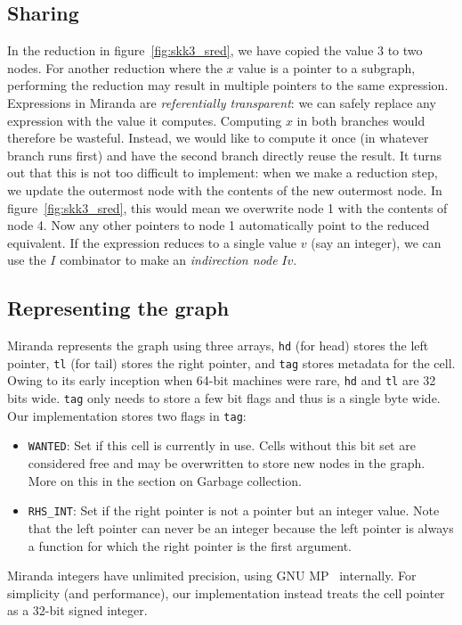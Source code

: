 \documentclass[conference]{IEEEtran}
\begin{document}
\subsection{Sharing}
In the reduction in figure~\ref{fig:skk3_sred}, we have copied the value $3$ to two nodes.
For another reduction where the $x$ value is a pointer to a subgraph, performing the reduction may result in multiple pointers to the same expression.
Expressions in Miranda are \textit{referentially transparent}: we can safely replace any expression with the value it computes.
Computing $x$ in both branches would therefore be wasteful.
Instead, we would like to compute it once (in whatever branch runs first) and have the second branch directly reuse the result.
It turns out that this is not too difficult to implement: when we make a reduction step, we update the outermost node with the contents of the new outermost node.
In figure~\ref{fig:skk3_sred}, this would mean we overwrite node 1 with the contents of node 4.
Now any other pointers to node 1 automatically point to the reduced equivalent.
If the expression reduces to a single value $v$ (say an integer), we can use the $I$ combinator to make an \textit{indirection node} $I v$.

\subsection{Representing the graph}
Miranda represents the graph using three arrays, \texttt{hd} (for head) stores the left pointer, \texttt{tl} (for tail) stores the right pointer, and \texttt{tag} stores metadata for the cell.
Owing to its early inception when 64-bit machines were rare, \texttt{hd} and \texttt{tl} are 32 bits wide.
\texttt{tag} only needs to store a few bit flags and thus is a single byte wide.
Our implementation stores two flags in \texttt{tag}:
\begin{itemize}
    \item \texttt{WANTED}: Set if this cell is currently in use. Cells without this bit set are considered free and may be overwritten to store new nodes in the graph. More on this in the section on Garbage collection.
    \item \texttt{RHS\_INT}: Set if the right pointer is not a pointer but an integer value. Note that the left pointer can never be an integer because the left pointer is always a function for which the right pointer is the first argument.
\end{itemize}

Miranda integers have unlimited precision, using GNU MP~\cite{gnump} internally.
For simplicity (and performance), our implementation instead treats the cell pointer as a 32-bit signed integer.
\end{document}
